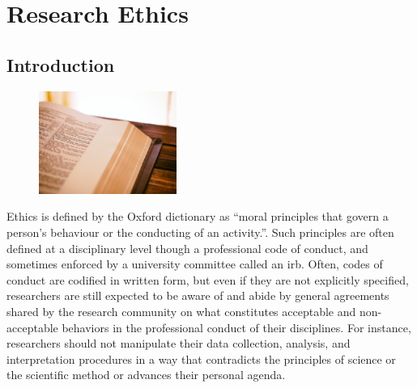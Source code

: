 \chapter{Research Ethics}\label{03:ethics}



\section{Introduction}

\begin{figure}
	\label{03:fig01} 
	\centering
	\includegraphics[width=0.4\textwidth]{gfx/03-book} 
\end{figure}

Ethics is defined by the Oxford dictionary as ``moral principles that govern a person's behaviour or the conducting of an activity.''\cite{oxford2018ethics}. Such principles are often defined at a disciplinary level though a professional code of conduct, and sometimes enforced by a university committee called an \gls{irb}. Often, codes of conduct are codified in written form, but even if they are not explicitly specified, researchers are still expected to be aware of and abide by general agreements shared by the research community on what constitutes acceptable and non-acceptable behaviors in the professional conduct of their disciplines. For instance, researchers should not manipulate their data collection, analysis, and interpretation procedures in a way that contradicts the principles of science or the scientific method or advances their personal agenda.

